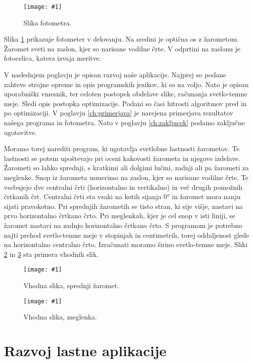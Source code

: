 \documentclass[oneside, a4paper, 12pt]{book}
\newcommand{\slika}[3]{
	\begin{figure}
	\begin{center}
	\texttt{[image: \#1]}
	\end{center}
	\vspace{-20pt}
	\caption{#2}
	\label{#3}
	\end{figure}
}
\begin{document}
\slika{slike/Photometer.jpg}{Slika fotometra.}{pic:fotometer}
Slika \ref{pic:fotometer} prikazuje fotometer v delovanju. Na sredini je optična os z žarometom. Žaromet sveti na zaslon, kjer so narisane vodilne črte. V odprtini na zaslonu je fotocelica, katera izvaja meritve.

V naslednjem poglavju je opisan razvoj naše aplikacije. Najprej so podane zahteve strojne opreme in opis programskih jezikov, ki so na voljo. Nato je opisan uporabniški vmesnik, ter celoten postopek obdelave slike, računanja svetlo-temne meje. Sledi opis postopka optimizacije. Podani so časi hitrosti algoritmov pred in po optimizaciji. V poglavju \ref{ch:primerjava} je narejena primerjava rezultatov našega programa in fotometra. Nato v poglavju \ref{ch:zakljucek} podamo zaključne ugotovitve.

Moramo torej narediti program, ki ugotavlja svetlobne lastnosti žarometov. Te lastnosti se potem upoštevajo pri oceni kakovosti žarometa in njegove izdelave. Žarometi so lahko sprednji, s kratkimi ali dolgimi lučmi, zadnji ali pa žarometi za meglenke. Snop iz žarometa usmerimo na zaslon, kjer so narisane vodilne črte. Te vsebujejo dve centralni črti (horizontalno in vertikalno) in več drugih pomožnih črtkanih črt. Centralni črti sta vsaki na kotih sijanja 0° in žaromet mora nanju sijati pravokotno. Pri sprednjih žarometih se tisto stran, ki sije višje, nastavi na prvo horizontalno črtkano črto. Pri meglenkah, kjer je cel snop v isti liniji, se žaromet nastavi na zadnjo horizontalno črtkano črto. S programom je potrebno najti prehod svetlo-temne meje v stopinjah in centimetrih, torej oddaljenost glede na horizontalno centralno črto. Izračunati moramo širino svetlo-temne meje. Sliki \ref{pic:vhp1} in \ref{pic:vhp2} sta primera vhodnih slik.

\pagebreak
\slika{slike/original.jpg}{Vhodna slika, sprednji žaromet.}{pic:vhp1}
\slika{slike/levi3.JPG}{Vhodna slika, meglenka.}{pic:vhp2}


\chapter{Razvoj lastne aplikacije}
\end{document}
